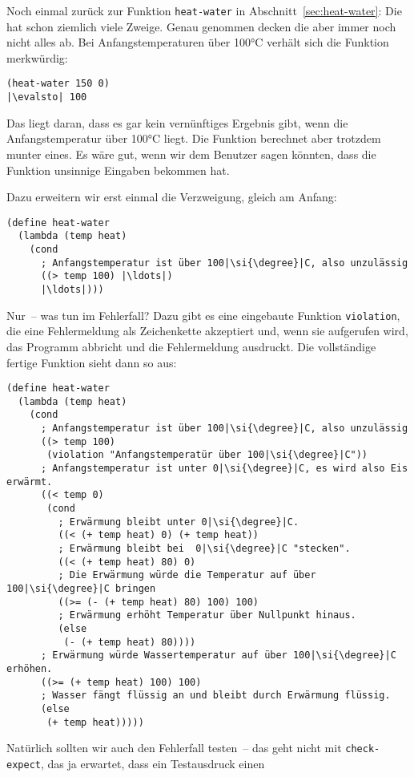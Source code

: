 Noch einmal zurück zur Funktion \lstinline{heat-water} in
Abschnitt~\ref{sec:heat-water}: Die hat schon ziemlich viele Zweige.
Genau genommen decken die aber immer noch nicht alles ab.  %
Bei Anfangstemperaturen über 100\si{\degree}C verhält sich die Funktion merkwürdig:
%
\begin{lstlisting}
(heat-water 150 0)
|\evalsto| 100
\end{lstlisting}
%
Das liegt daran, dass es gar kein vernünftiges Ergebnis gibt, wenn die
Anfangstemperatur über 100\si{\degree}C liegt.  Die Funktion berechnet aber
trotzdem munter eines.  Es wäre gut, wenn wir dem Benutzer sagen
könnten, dass die Funktion unsinnige Eingaben bekommen hat.

Dazu erweitern wir erst einmal die Verzweigung, gleich am Anfang:
%
\begin{lstlisting}
(define heat-water
  (lambda (temp heat)
    (cond
      ; Anfangstemperatur ist über 100|\si{\degree}|C, also unzulässig
      ((> temp 100) |\ldots|)
      |\ldots|)))
\end{lstlisting}
%
Nur~-- was tun im Fehlerfall?  Dazu gibt es eine eingebaute Funktion
\lstinline{violation},\label{sec:violation} die eine Fehlermeldung als Zeichenkette akzeptiert
und, wenn sie aufgerufen wird, das Programm abbricht und die
Fehlermeldung ausdruckt.  Die vollständige fertige Funktion sieht
dann so aus:
%
\begin{lstlisting}
(define heat-water
  (lambda (temp heat)
    (cond
      ; Anfangstemperatur ist über 100|\si{\degree}|C, also unzulässig
      ((> temp 100)
       (violation "Anfangstemperatür über 100|\si{\degree}|C"))
      ; Anfangstemperatur ist unter 0|\si{\degree}|C, es wird also Eis erwärmt.
      ((< temp 0)
       (cond
         ; Erwärmung bleibt unter 0|\si{\degree}|C.
         ((< (+ temp heat) 0) (+ temp heat))
         ; Erwärmung bleibt bei  0|\si{\degree}|C "stecken".
         ((< (+ temp heat) 80) 0)
         ; Die Erwärmung würde die Temperatur auf über 100|\si{\degree}|C bringen
         ((>= (- (+ temp heat) 80) 100) 100)
         ; Erwärmung erhöht Temperatur über Nullpunkt hinaus.
         (else
          (- (+ temp heat) 80))))
      ; Erwärmung würde Wassertemperatur auf über 100|\si{\degree}|C erhöhen.
      ((>= (+ temp heat) 100) 100)
      ; Wasser fängt flüssig an und bleibt durch Erwärmung flüssig.
      (else
       (+ temp heat)))))
\end{lstlisting}
%
Natürlich sollten wir auch den Fehlerfall testen~-- das geht nicht mit
\lstinline{check-expect}, das ja erwartet, dass ein Testausdruck einen

